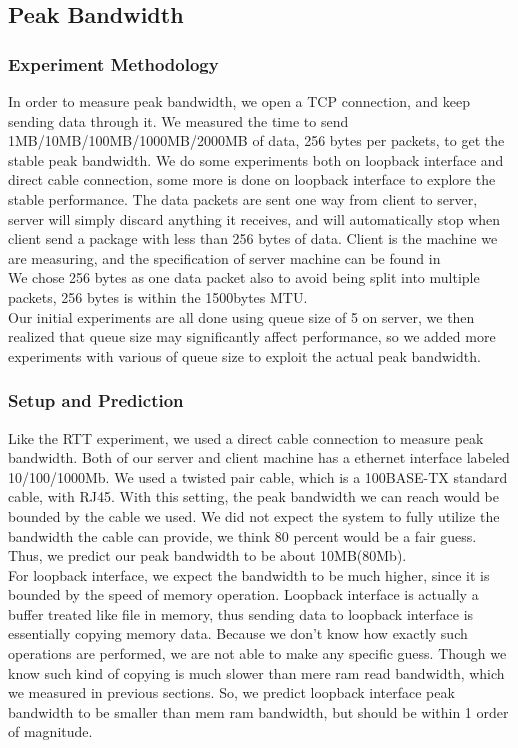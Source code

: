 \documentclass{article} %
\begin{document}
\subsection{Peak Bandwidth}
\subsubsection{Experiment Methodology}
In order to measure peak bandwidth, we open a TCP connection, and keep sending data through it. We measured the time to send 1MB/10MB/100MB/1000MB/2000MB of data, 256 bytes per packets, to get the stable peak bandwidth. We do some experiments both on loopback interface and direct cable connection, some more is done on loopback interface to explore the stable performance. The data packets are sent one way from client to server, server will simply discard anything it receives, and will automatically stop when client send a package with less than 256 bytes of data. Client is the machine we are measuring, and the specification of server machine can be found in \\%
We chose 256 bytes as one data packet also to avoid being split into multiple packets, 256 bytes is within the 1500bytes MTU.\\
Our initial experiments are all done using queue size of 5 on server, we then realized that queue size may significantly affect performance, so we added more experiments with various of queue size to exploit the actual peak bandwidth.\\

\subsubsection{Setup and Prediction}
Like the RTT experiment, we used a direct cable connection to measure peak bandwidth. Both of our server and client machine has a ethernet interface labeled 10/100/1000Mb. We used a twisted pair cable, which is a 100BASE-TX standard cable, with RJ45. With this setting, the peak bandwidth we can reach would be bounded by the cable we used. We did not expect the system to fully utilize the bandwidth the cable can provide, we think 80 percent would be a fair guess. Thus, we predict our peak bandwidth to be about 10MB(80Mb).\\ %
For loopback interface, we expect the bandwidth to be much higher, since it is bounded by the speed of memory operation. Loopback interface is actually a buffer treated like file in memory, thus sending data to loopback interface is essentially copying memory data. Because we don't know how exactly such operations are performed, we are not able to make any specific guess. Though we know such kind of copying is much slower than mere ram read bandwidth, which we measured in previous sections. So, we predict loopback interface peak bandwidth to be smaller than mem ram bandwidth, but should be within 1 order of magnitude. \\
\end{document}
